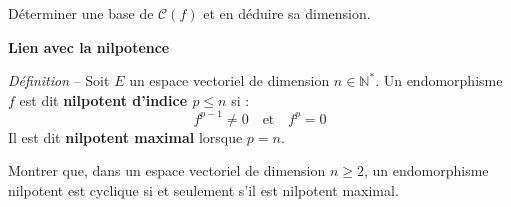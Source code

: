 \documentclass[10pt,a4paper]{article}
\begin{document}
\q Déterminer une base de $\mathscr{C}(f)$ et en déduire sa dimension.

\bigskip
\textbf{Lien avec la nilpotence}

\textit{Définition} -- Soit $E$ un espace vectoriel de dimension $n \in \mathbb{N}^*$. Un
endomorphisme $f$ est dit \textbf{nilpotent d'indice $p \leq n$} si :
\[
f^{p-1} \neq 0 \quad \text{et} \quad f^p = 0
\]
Il est dit \textbf{nilpotent maximal} lorsque $p = n$.

\q Montrer que, dans un espace vectoriel de dimension $n \geq 2$, un endomorphisme nilpotent est
cyclique si et seulement s'il est nilpotent maximal.
\end{document}
